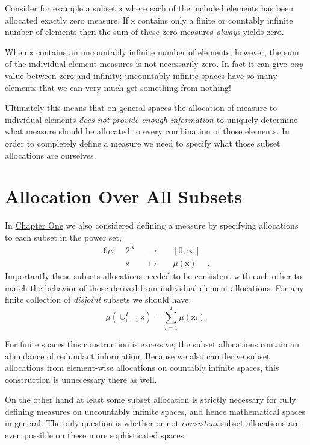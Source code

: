 \documentclass[
  letterpaper,
  DIV=11,
  numbers=noendperiod]{scrartcl}
\begin{document}
Consider for example a subset \(\mathsf{x}\) where each of the included
elements has been allocated exactly zero measure. If \(\mathsf{x}\)
contains only a finite or countably infinite number of elements then the
sum of these zero measures \emph{always} yields zero.

When \(\mathsf{x}\) contains an uncountably infinite number of elements,
however, the sum of the individual element measures is not necessarily
zero. In fact it can give \emph{any} value between zero and infinity;
uncountably infinite spaces have so many elements that we can very much
get something from nothing!

Ultimately this means that on general spaces the allocation of measure
to individual elements \emph{does not provide enough information} to
uniquely determine what measure should be allocated to every combination
of those elements. In order to completely define a measure we need to
specify what those subset allocations are ourselves.

\hypertarget{allocation-over-all-subsets}{%
\section{Allocation Over All
Subsets}\label{allocation-over-all-subsets}}

In
\href{https://betanalpha.github.io/assets/chapters_html/probability_on_finite_sets.html}{Chapter
One} we also considered defining a measure by specifying allocations to
each subset in the power set, \begin{alignat*}{6}
\mu :\; & 2^{X} & &\rightarrow& \; & [0, \infty] &
\\
& \mathsf{x} & &\mapsto& & \mu(\mathsf{x}) &.
\end{alignat*} Importantly these subsets allocations needed to be
consistent with each other to match the behavior of those derived from
individual element allocations. For any finite collection of
\emph{disjoint} subsets we should have \[
\mu( \cup_{i = 1}^{I} \mathsf{x} )
=
\sum_{i = 1}^{I} \mu( \mathsf{x}_{i}).
\]

For finite spaces this construction is excessive; the subset allocations
contain an abundance of redundant information. Because we also can
derive subset allocations from element-wise allocations on countably
infinite spaces, this construction is unnecessary there as well.

On the other hand at least some subset allocation is strictly necessary
for fully defining measures on uncountably infinite spaces, and hence
mathematical spaces in general. The only question is whether or not
\emph{consistent} subset allocations are even possible on these more
sophisticated spaces.
\end{document}
